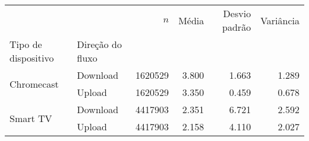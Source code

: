 \begin{tabular}{llrrrr}
	\toprule
	                               &                  & $n$     & Média & Desvio padrão & Variância \\
	Tipo de dispositivo            & Direção do fluxo &         &       &               &           \\
	\midrule
	\multirow[t]{2}{*}{Chromecast} & Download         & 1620529 & 3.800 & 1.663         & 1.289     \\
	                               & Upload           & 1620529 & 3.350 & 0.459         & 0.678     \\
	\cline{1-6}
	\multirow[t]{2}{*}{Smart TV}   & Download         & 4417903 & 2.351 & 6.721         & 2.592     \\
	                               & Upload           & 4417903 & 2.158 & 4.110         & 2.027     \\
	\cline{1-6}
	\bottomrule
\end{tabular}
